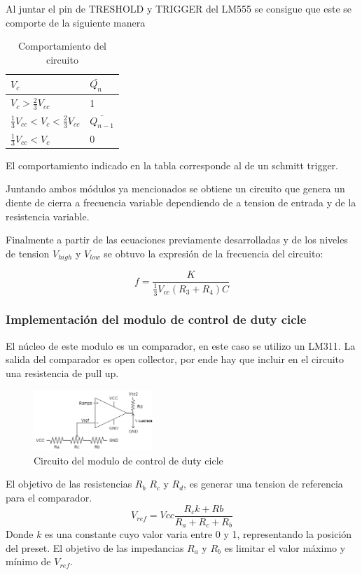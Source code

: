 \documentclass[../../ASSD_TP1_G7.tex]{subfiles}
\begin{document}
Al juntar  el pin de TRESHOLD y TRIGGER del LM555 se consigue que este se comporte de la siguiente manera

\begin{table}[htbp]
\begin{center}
\begin{tabular}{|l|l|}
\hline
$V_c$ & $\bar{Q_n}$ \\
\hline \hline
$V_c>\frac{2}{3}V_{cc}$ & 1 \\ \hline
$\frac{1}{3}V_{cc}<V_c<\frac{2}{3}V_{cc}$ & $\bar{Q_{n-1}}$ \\ \hline
$\frac{1}{3}V_{cc}<V_c$ & 0 \\ \hline
\end{tabular}
\caption{Comportamiento del circuito}

\end{center}
\end{table}
El comportamiento indicado en la tabla corresponde al de un schmitt trigger.

\par Juntando ambos módulos ya mencionados se obtiene un circuito que genera un diente de cierra a frecuencia variable dependiendo de a tension de entrada y de la resistencia variable.
\par Finalmente a partir de las ecuaciones previamente desarrolladas y de los niveles de tension $V_{high}$ y $V_{low}$ se obtuvo la expresión de la frecuencia del circuito:

\begin{equation}
f=\frac{K}{\frac{1}{3}V_{cc} (R_3+R_4) C}
\end{equation}

\subsubsection*{Implementación del modulo de control de duty cicle}
\par El núcleo de este modulo es un comparador, en este caso se utilizo un LM311. La salida del comparador es open collector, por ende hay que incluir en el circuito una resistencia de pull up.
\par 

\begin{figure}[H]
\centering
\includegraphics[width=0.4\textwidth]{figures/comp.png}
\caption{Circuito del modulo de control de duty cicle}\label{fig:comp}
\end{figure}
El objetivo de las resistencias $R_b$ $R_c$ y $R_d$, es generar una tension de referencia para el comparador.
\begin{equation}
V_{ref}=Vcc \frac{R_ck + Rb}{R_a + R_c + R_b}
\end{equation}
Donde $k$ es una constante cuyo valor varia entre 0 y 1, representando la posición del preset. El objetivo de las impedancias $R_a$ y $R_b$ es limitar el valor máximo y mínimo de $V_{ref}$. 
\end{document}
